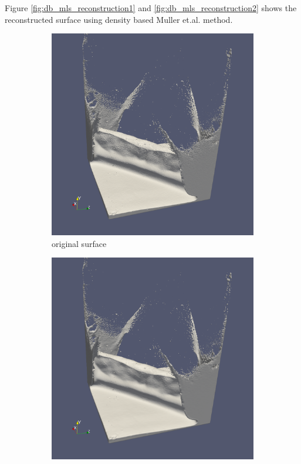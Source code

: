 Figure \ref{fig:db_mls_reconstruction1} and \ref{fig:db_mls_reconstruction2} shows the reconstructed surface using density based Muller et.al. method. 
\begin{figure}
	\begin{center}
		\begin{subfigure}[b]{0.47\textwidth}
			\includegraphics[width=\textwidth]{figures/DDMOriginal1.png}
			\caption{original surface}
		\end{subfigure}
		\begin{subfigure}[b]{0.47\textwidth}
			\includegraphics[width=\textwidth]{figures/DDMMls1.png}

\end{subfigure}
\end{center}
\end{figure}

